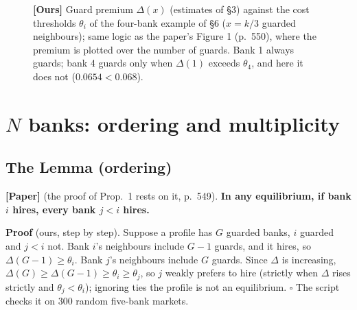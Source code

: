 \documentclass[11pt,a4paper]{article}
\newcommand{\paper}{\textbf{[Paper]}}
\newcommand{\ours}{\textbf{[Ours]}}
\newcommand{\Dl}{\Delta}
\begin{document}
\begin{figure}[ht]
\centering
{}
\caption{\ours{} Guard premium $\Dl(x)$ (estimates of \S3) against the cost thresholds $\theta_i$ of the four-bank example of \S6
($x=k/3$ guarded neighbours); same logic as the paper's Figure 1 (p.\ 550), where the premium is plotted over the number of guards.
Bank 1 always guards; bank 4 guards only when $\Dl(1)$ exceeds $\theta_4$, and here it does not ($0.0654<0.068$).}
\end{figure}

\section{$N$ banks: ordering and multiplicity}

\subsection{The Lemma (ordering)}
\paper{} (the proof of Prop.\ 1 rests on it, p.\ 549). \textbf{In any equilibrium, if bank $i$ hires, every bank $j<i$ hires.}

\textbf{Proof} (ours, step by step). Suppose a profile has $G$ guarded banks, $i$ guarded and $j<i$ not. Bank $i$'s
neighbours include $G-1$ guards, and it hires, so $\Dl(G-1)\ge\theta_i$. Bank $j$'s neighbours include $G$ guards.
Since $\Dl$ is increasing, $\Dl(G)\ge\Dl(G-1)\ge\theta_i\ge\theta_j$, so $j$ weakly prefers to hire (strictly when $\Dl$ rises strictly and $\theta_j<\theta_i$); ignoring ties the profile is not an
equilibrium. $\square$ The script checks it on 300 random five-bank markets.
\end{document}
